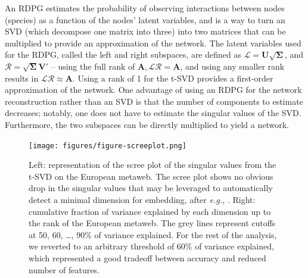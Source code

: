 \begin{refsection}
An RDPG estimates the probability of observing interactions between
nodes (species) as a function of the nodes' latent variables, and is a
way to turn an SVD (which decompose one matrix into three) into two
matrices that can be multiplied to provide an approximation of the
network. The latent variables used for the RDPG, called the left and
right subspaces, are defined as
$\mathscr{L} = \mathbf{U}\sqrt{\mathbf{\Sigma}}$, and
$\mathscr{R} = \sqrt{\mathbf{\Sigma}}\mathbf{V}'$ -- using the full
rank of $\mathbf{A}, \mathscr{L}\mathscr{R} = \mathbf{A}$, and
using any smaller rank results in
$\mathscr{L}\mathscr{R} \approx \mathbf{A}$. Using a rank of 1 for the
t-SVD provides a first-order approximation of the network. One advantage
of using an RDPG for the network reconstruction rather than an SVD is
that the number of components to estimate decreases; notably, one does
not have to estimate the singular values of the SVD. Furthermore, the
two subspaces can be directly multiplied to yield a network.

\begin{figure}[h]
    \centering
    \texttt{[image: figures/figure-screeplot.png]}
    \caption{Left: representation of the scree plot of the singular values
from the t-SVD on the European metaweb. The scree plot shows no obvious
drop in the singular values that may be leveraged to automatically
detect a minimal dimension for embedding, after \emph{e.g.,}
\cite{Zhu2006Automatic}. Right: cumulative fraction of variance explained by each
dimension up to the rank of the European metaweb. The grey lines
represent cutoffs at 50, 60, \ldots, 90\% of variance explained. For the
rest of the analysis, we reverted to an arbitrary threshold of 60\% of
variance explained, which represented a good tradeoff between accuracy
and reduced number of features.}
    \label{fig:scree}
\end{figure}


\end{refsection}

